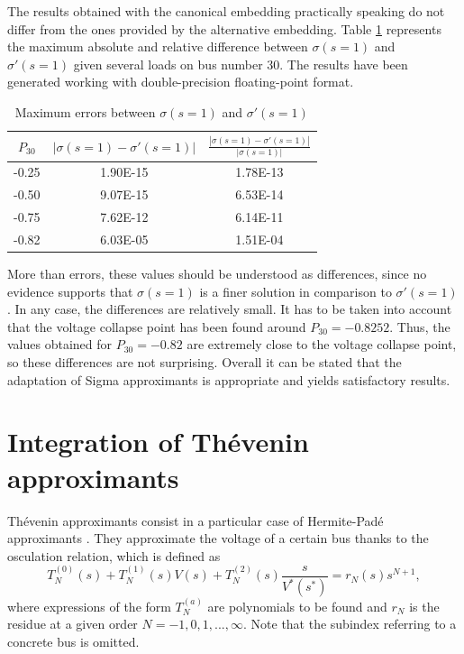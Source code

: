 \documentclass[journal]{IEEEtran}
\begin{document}
The results obtained with the canonical embedding practically speaking do not differ from the ones provided by the alternative embedding. Table \ref{tab:1} represents the maximum absolute and relative difference between $\sigma(s=1)$ and $\sigma'(s=1)$ given several loads on bus number 30. The results have been generated working with double-precision floating-point format.
\begin{table}[!ht]
\renewcommand{\arraystretch}{1.3}
\caption{Maximum errors between $\sigma(s=1)$ and $\sigma'(s=1)$}
\label{tab:1}
\centering
\begin{tabular}{ccc}
\hline
$P_{30}$ & $|\sigma(s=1)-\sigma'(s=1)|$ & $\frac{|\sigma(s=1)-\sigma'(s=1)|}{|\sigma(s=1)|}$\\
\hline
-0.25 & 1.90E-15 & 1.78E-13\\
-0.50 & 9.07E-15 & 6.53E-14\\
-0.75 & 7.62E-12 & 6.14E-11\\
-0.82 & 6.03E-05 & 1.51E-04\\
\hline
\end{tabular}
\end{table} 

More than errors, these values should be understood as differences, since no evidence supports that $\sigma(s=1)$ is a finer solution in comparison to $\sigma'(s=1)$. In any case, the differences are relatively small. It has to be taken into account that the voltage collapse point has been found around $P_{30}=-0.8252$. Thus, the values obtained for $P_{30}=-0.82$ are extremely close to the voltage collapse point, so these differences are not surprising. Overall it can be stated that the adaptation of Sigma approximants is appropriate and yields satisfactory results. 

\section{Integration of Thévenin approximants} \label{sec4}
Thévenin approximants consist in a particular case of Hermite-Padé approximants \cite{Trias2018}. They approximate the voltage of a certain bus thanks to the osculation relation, which is defined as
\begin{equation}
  T^{(0)}_N(s)+T^{(1)}_N(s)V(s)+T^{(2)}_N(s)\frac{s}{V^*(s^*)} = r_N(s)s^{N+1},
  \label{t1}
\end{equation}
where expressions of the form $T^{(a)}_N$ are polynomials to be found and $r_N$ is the residue at a given order $N=-1,0,1,...,\infty$. Note that the subindex referring to a concrete bus is omitted. 
\end{document}
